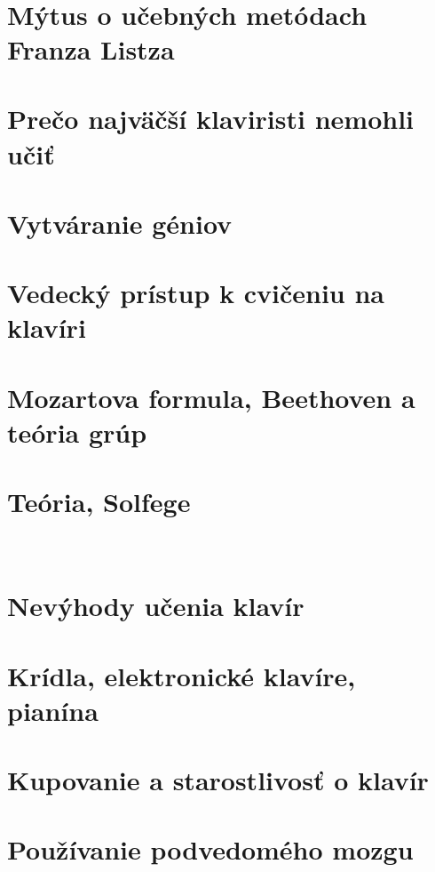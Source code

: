 \documentclass[11pt,a4paper]{book}
\begin{document}
\ 
\section{Mýtus o učebných metódach Franza Listza}\label{s:myth-methods}

\section{Prečo najväčší klaviristi nemohli učiť}\label{s:why-greatest}

\section{Vytváranie géniov}\label{s:creating-geniuses}

\section{Vedecký prístup k cvičeniu na klavíri}\label{s:scientific-approach}

\section{Mozartova formula, Beethoven a teória grúp}\label{s:mozarts-formula}

\section{Teória, Solfege}\label{s:theory}
\ 
\section{Nevýhody učenia klavír}\label{s:disadvantages-learning}

\section{Krídla, elektronické klavíre, pianína}\label{s:grand}

\section{Kupovanie a starostlivosť o klavír}\label{s:purchasing-pianos}

\section{Používanie podvedomého mozgu}\label{s:using-subconscious}
\end{document}
